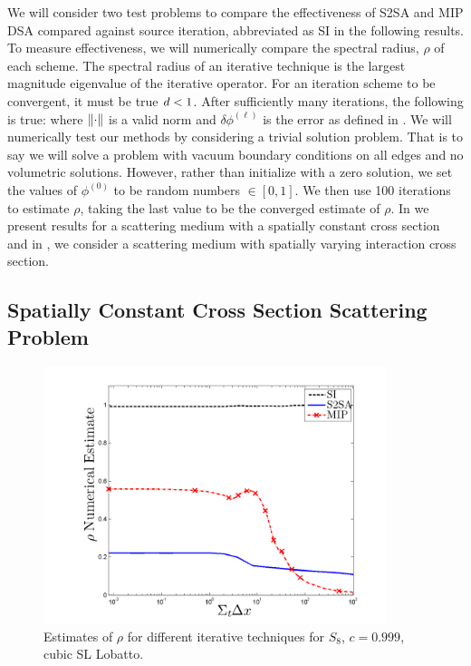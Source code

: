 We will consider two test problems to compare the effectiveness of S2SA and MIP DSA compared against source iteration, abbreviated as SI in the following results.
To measure effectiveness, we will  numerically compare the spectral radius, $\rho$ of each scheme.
The spectral radius of an iterative technique is the largest magnitude eigenvalue of the iterative operator.
For an iteration scheme to be convergent, it must be true $ d < 1$.
After sufficiently many iterations, the following is true:
\benum
{} \leq \rho {} \pec
\eenum
where $\left\lVert \cdot \right\rVert$ is a valid norm and $\delta \phi^{(\ell)}$ is the error as defined in .
We will numerically test our methods by considering a trivial solution problem.  
That is to say we will solve a problem with vacuum boundary conditions on all edges and no volumetric solutions.  
However, rather than initialize with a zero solution, we set the values of $\phi^{(0)}$ to be random numbers $\in[0,1]$.
We then use 100 iterations to estimate $\rho$, taking the last value to be the converged estimate of $\rho$.
In  we present results for a scattering medium with a spatially constant cross section and in , we consider a scattering medium with spatially varying interaction cross section.

\subsection{Spatially Constant Cross Section Scattering Problem}
\label{sec:chap4_constant_xs}

\begin{figure}[!htp]
\centering
\includegraphics[width=10cm]{Constant_XS_SN8_P3_Lobatto_Solvers.png}
\caption{Estimates of $\rho$ for different iterative techniques for $S_8$, $c=0.999$, cubic SL Lobatto.}
\label{fig:p3_solvers}
\end{figure}

